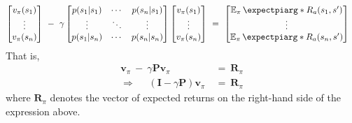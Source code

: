 \documentclass[twoside,11pt]{homework}
\DeclarePairedDelimiter{\2norm}{\lVert}{\rVert^2_2}
\newcommand{\1}[1]{\mathds{1}\left[#1\right]}
\newcommand{\expectpi}{\operatorname{\mathbb{E}_{\pi}}\expectpiarg}
\begin{document}
\begin{align*}
\begin{bmatrix} v_{\pi}(s_1) \\ \vdots \\ v_{\pi}(s_n) \end{bmatrix} \ -  \  \gamma\begin{bmatrix} p(s_1 | s_1) & \cdots & p(s_n | s_1) \\ \vdots & \ddots & \vdots \\ p(s_1 | s_n) & \cdots & p(s_n | s_n)  \end{bmatrix} \begin{bmatrix} v_{\pi}(s_1) \\ \vdots \\ v_{\pi}(s_n) \end{bmatrix} \ & = \ \begin{bmatrix} \expectpi*{R_a(s_1, s')} \\ \vdots \\ \expectpi*{R_a(s_n, s')} \end{bmatrix} 
\end{align*}
That is,  
\begin{align*}
\mathbf{v}_{\pi} \ - \ \gamma \mathbf{P} \mathbf{v}_{\pi} \ & = \ \mathbf{R}_{\pi}\\
\Longrightarrow \ \ \ \ \ \ \left(\mathbf{I} - \gamma \mathbf{P}\right)\mathbf{v}_{\pi} \ & = \ \mathbf{R}_{\pi}
\end{align*}
where $\mathbf{R}_{\pi}$ denotes the vector of expected returns on the right-hand side of the expression above.
\end{document}
